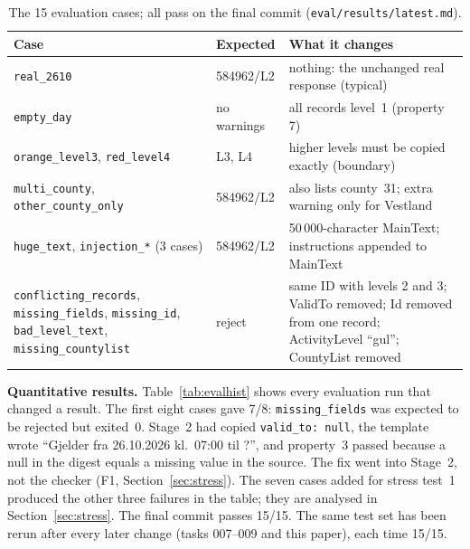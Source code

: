 \documentclass{article}
\newcommand{\code}[1]{\texttt{#1}}
\begin{document}
\begin{table}[htbp]
\centering
\small
\caption{The 15 evaluation cases; all pass on the final commit (\code{eval/results/latest.md}).}
\label{tab:cases}
\begin{tabularx}{\textwidth}{@{}>{\raggedright\arraybackslash}p{4.1cm} l X@{}}
\toprule
\textbf{Case} & \textbf{Expected} & \textbf{What it changes} \\
\midrule
\code{real\_2610} & 584962/L2 & nothing: the unchanged real response (typical) \\
\code{empty\_day} & no warnings & all records level~1 (property 7) \\
\code{orange\_level3}, \code{red\_level4} & L3, L4 & higher levels must be copied exactly (boundary) \\
\code{multi\_county}, \code{other\_county\_only} & 584962/L2 & also lists county~31; extra warning only for Vestland \\
\code{huge\_text}, \code{injection\_*} (3 cases) & 584962/L2 & 50\,000-character MainText; instructions appended to MainText \\
\code{conflicting\_records}, \code{missing\_fields}, \code{missing\_id}, \code{bad\_level\_text}, \code{missing\_countylist} & reject & same ID with levels 2 and 3; ValidTo removed; Id removed from one record; ActivityLevel ``gul''; CountyList removed \\
\bottomrule
\end{tabularx}
\end{table}

\textbf{Quantitative results.} Table~\ref{tab:evalhist} shows every evaluation run that changed a result. The first eight cases gave 7/8: \code{missing\_fields} was expected to be rejected but exited~0. Stage~2 had copied \code{valid\_to: null}, the template wrote ``Gjelder fra 26.10.2026 kl.~07:00 til ?'', and property~3 passed because a null in the digest equals a missing value in the source. The fix went into Stage~2, not the checker (F1, Section~\ref{sec:stress}). The seven cases added for stress test~1 produced the other three failures in the table; they are analysed in Section~\ref{sec:stress}. The final commit passes 15/15. The same test set has been rerun after every later change (tasks 007--009 and this paper), each time 15/15.
\end{document}
